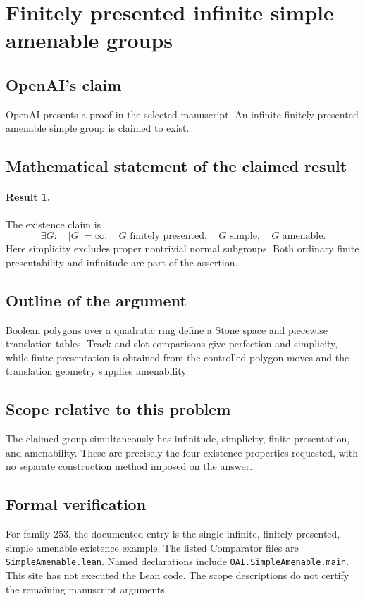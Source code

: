 \documentclass[11pt]{article}
\begin{document}
\section*{Finitely presented infinite simple amenable groups}

\subsection{OpenAI's claim}
OpenAI presents a proof in the selected manuscript. An infinite finitely presented amenable simple group is claimed to exist.

\subsection{Mathematical statement of the claimed result}
\paragraph{Result 1.} The existence claim is
\[
 \exists G:\quad |G|=\infty,\quad
 G\text{ finitely presented},\quad G\text{ simple},\quad G\text{ amenable}.
\]
Here simplicity excludes proper nontrivial normal subgroups. Both ordinary finite presentability and infinitude are part of the assertion.

\subsection{Outline of the argument}
Boolean polygons over a quadratic ring define a Stone space and piecewise translation tables. Track and slot comparisons give perfection and simplicity, while finite presentation is obtained from the controlled polygon moves and the translation geometry supplies amenability.

\subsection{Scope relative to this problem}
The claimed group simultaneously has infinitude, simplicity, finite presentation, and amenability. These are precisely the four existence properties requested, with no separate construction method imposed on the answer.

\subsection{Formal verification}
For family 253, the documented entry is the single infinite, finitely presented, simple amenable existence example. The listed Comparator files are \texttt{SimpleAmenable.lean}. Named declarations include \texttt{OAI.SimpleAmenable.main}. This site has not executed the Lean code. The scope descriptions do not certify the remaining manuscript arguments.
\end{document}
